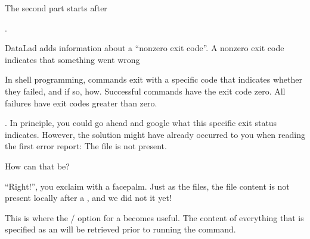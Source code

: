 \sphinxAtStartPar
The second part starts after

\sphinxAtStartPar
{}.

\sphinxAtStartPar
DataLad adds information about a “non\sphinxhyphen{}zero exit code”. A non\sphinxhyphen{}zero exit code indicates
that something went wrong%
\begin{footnote}\sphinxAtStartFootnote
In shell programming, commands exit with a specific code that indicates
whether they failed, and if so, how. Successful commands have the exit code zero. All failures
have exit codes greater than zero.
%
\end{footnote}. In principle, you could go ahead and google what this
specific exit status indicates. However, the solution might have already occurred to you when
reading the first error report: The file is not present.

\sphinxAtStartPar
How can that be?

\sphinxAtStartPar
“Right!”, you exclaim with a facepalm.
Just as the  files, the  file content is not present
locally after a , and we did not  it yet!

\ignorespaces 
\sphinxAtStartPar
This is where the / option for a  becomes useful.
The content of everything that is specified as an  will be retrieved
prior to running the command.

